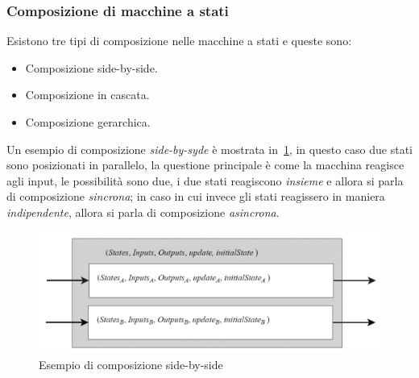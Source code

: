 \subsubsection{Composizione di macchine a stati}
Esistono tre tipi di composizione nelle macchine a stati e queste sono:
\begin{itemize}
\item Composizione side-by-side.
\item Composizione in cascata.
\item Composizione gerarchica.
\end{itemize}
Un esempio di composizione \emph{side-by-syde} è mostrata in \figurename\,\ref{fig:sidebyside}, in questo caso due stati sono posizionati in parallelo, la questione principale è come la macchina reagisce agli input, le possibilità sono due, i due stati reagiscono \emph{insieme} e allora si parla di composizione \emph{sincrona}; in caso in cui invece gli stati reagissero in maniera \emph{indipendente}, allora si parla di composizione \emph{asincrona}.
\begin{figure}
\centering
\includegraphics[scale=0.4]{img/sidebyside.png}
\caption{Esempio di composizione side-by-side}\label{fig:sidebyside}
\end{figure}
